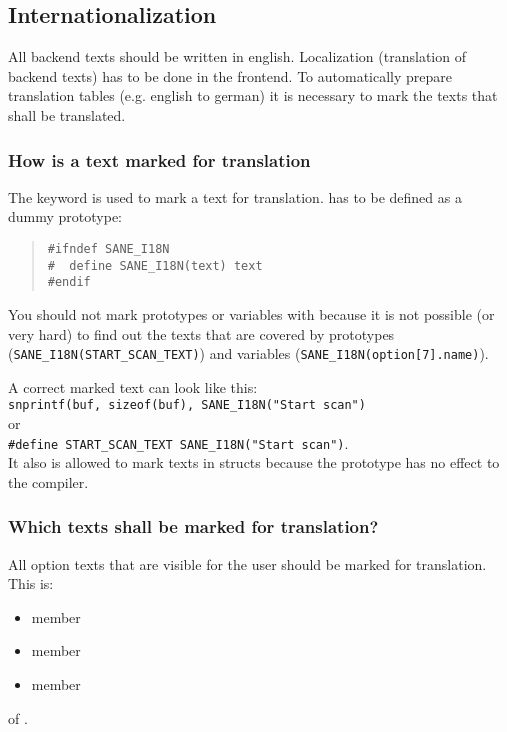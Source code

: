 \documentclass[11pt,DVIps]{report}
\begin{document}
\subsection{Internationalization}\label{sec:i18n}
\begin{changebar}
All backend texts should be written in english.
Localization (translation of backend texts) has to be done
in the frontend. To automatically prepare translation tables
(e.g. english to german) it is necessary to mark the texts
that shall be translated.

\subsubsection{How is a text marked for translation}

The keyword  is used to mark a text for translation.
 has to be defined as a dummy prototype:

  \begin{quote}
\begin{verbatim}
#ifndef SANE_I18N
#  define SANE_I18N(text) text
#endif
\end{verbatim}
  \end{quote}

You should not mark prototypes or variables with 
because it is not possible (or very hard) to find out the
texts that are covered by prototypes (\verb|SANE_I18N(START_SCAN_TEXT)|) and
variables (\verb|SANE_I18N(option[7].name)|).

A correct marked text can look like this:\\
\verb|snprintf(buf, sizeof(buf), SANE_I18N("Start scan")|\\
or\\
\verb|#define START_SCAN_TEXT SANE_I18N("Start scan")|.\\
It also is allowed to mark texts in structs because the
prototype  has no effect to the compiler.

\subsubsection{Which texts shall be marked for translation?}
All option texts that are visible for the user should be marked for
translation. This is:
\begin{itemize}
\item
member 
\item
member 
\item
member 
\end{itemize}
of .


\end{changebar}
\end{document}
